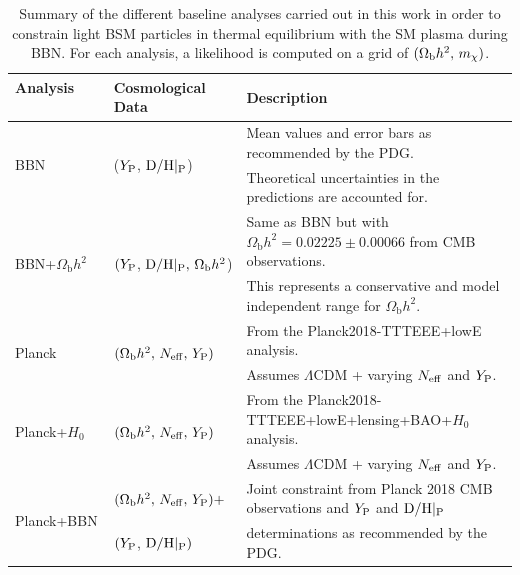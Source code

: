 \documentclass[notitlepage,letterpaper,natbib,aps,prd,onecolumn,amsmath,amsfonts,nofootinbib,preprintnumbers,superscriptaddress,secnumarabic,groupedaddress]{revtex4-1}
\begin{document}
\begin{table}[t]
\begin{center}
{\def\arraystretch{0.9}
\begin{tabular}{lll}
\hline\hline
\textbf{Analysis}  $\qquad$            	   & \textbf{Cosmological Data} $ \,\,\,$	& \textbf{Description} \\ \hline\hline
\multirow{2}{*}{BBN}    &  \multirow{2}{*}{($Y_{\rm P}$,\,\,${\rm D/H}|_{\rm P}$)} & Mean values and error bars as recommended by the PDG. \\
 & & Theoretical uncertainties in the predictions are accounted for. \\ \hline

\multirow{2}{*}{BBN+$\Omega_\mathrm{b} h^2$}   & \multirow{2}{*}{$(Y_{\rm P}$,\,\,${\rm D/H}|_{\rm P},\,\Omega_\mathrm{b} h^2$)} & Same as BBN but with $\Omega_\mathrm{b} h^2 = 0.02225 \pm 0.00066$ from CMB observations. \\
 & & This represents a conservative and model independent range for $\Omega_\mathrm{b} h^2$. \\ \hline

\multirow{2}{*}{Planck}  & \multirow{2}{*}{$(\Omega_\mathrm{b} h^2,\,N_{\rm eff},\,Y_{\rm P})$} & From the Planck2018-TTTEEE+lowE analysis. \\
 & & Assumes $\Lambda$CDM + varying $N_{\rm eff}$ and $Y_{\rm P}$. \\ \hline

\multirow{2}{*}{Planck+$H_0$}  & \multirow{2}{*}{$(\Omega_\mathrm{b} h^2,\,N_{\rm eff},\,Y_{\rm P})$} & From the Planck2018-TTTEEE+lowE+lensing+BAO+$H_0$ analysis. \\
 & & Assumes $\Lambda$CDM + varying $N_{\rm eff}$ and $Y_{\rm P}$. \\ \hline

\multirow{2}{*}{Planck+BBN} & $(\Omega_\mathrm{b} h^2,\,N_{\rm eff},\,Y_{\rm P}) +$ & Joint constraint from Planck 2018 CMB observations and $Y_{\rm P}$ and ${\rm D/H}|_{\rm P}$\\
 & $(Y_{\rm P}$,\,\,${\rm D/H}|_{\rm P})$ & determinations as recommended by the PDG. \\   \hline \hline
\end{tabular}
}
\end{center}\vspace{-0.3cm}
\caption{Summary of the different baseline analyses carried out in this work in order to constrain light BSM particles in thermal equilibrium with the SM plasma during BBN. For each analysis, a likelihood is computed on a grid of $(\Omega_{\rm b} h^2,\,m_\chi)$. }\label{tab:analysis_summary}
\end{table}
\end{document}
